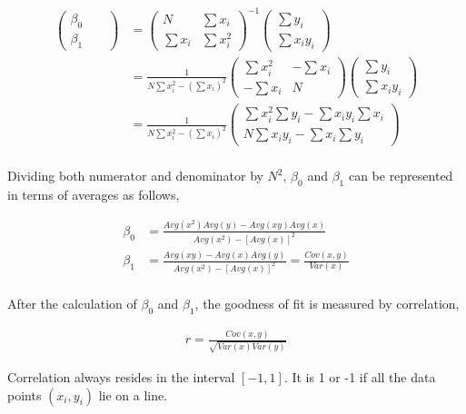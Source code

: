 \documentclass[11pt, a4paper]{article}
\begin{document}
\begin{align*}
	\begin{pmatrix} \beta_0 &                                                                   &           \\ \beta_1 \end{pmatrix} &= \begin{pmatrix} N & \sum x_i \\ \sum x_i & \sum x_i^2 \end{pmatrix}^{-1} \begin{pmatrix}
	\sum y_i \\ \sum x_iy_i \end{pmatrix} \\
	                        & = \frac{1}{N\sum x_i^2 - (\sum x_i)^2} \begin{pmatrix} \sum x_i^2 & -\sum x_i \\ -\sum x_i & N \end{pmatrix} \begin{pmatrix}
	\sum y_i \\ \sum x_iy_i \end{pmatrix} \\
	&= \frac{1}{N\sum x_i^2 - (\sum x_i)^2} \begin{pmatrix}
	\sum x_i^2 \sum y_i -\sum x_iy_i  \sum x_i  \\ N \sum x_i y_i - \sum x_i \sum y_i \end{pmatrix} \\
\end{align*}

Dividing both numerator and denominator by $N^2$, $\beta_0$ and $\beta_1$ can be represented in terms of averages as follows, 

\begin{align*}
	\beta_0 & = \frac{Avg(x^2)Avg(y) - Avg(xy)Avg(x)}{Avg(x^2) - [Avg(x)]^2}                    \\
	\beta_1 & = \frac{Avg(xy) - Avg(x)Avg(y)}{Avg(x^2) - [Avg(x)]^2} = \frac{Cov(x, y)}{Var(x)} \\
\end{align*}

After the calculation of $\beta_0$ and $\beta_1$, the goodness of fit is measured by correlation,

\begin{align*}
	r = \frac{Cov(x, y)}{\sqrt{Var(x)Var(y)}} 
\end{align*}

Correlation always resides in the interval $[-1, 1]$. It is 1 or -1 if all the data points $(x_i, y_i)$ lie on a line.
\end{document}
